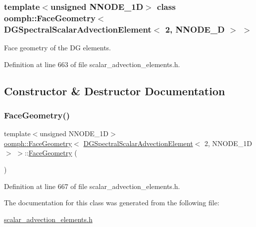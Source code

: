 \subsubsection*{template$<$unsigned N\+N\+O\+D\+E\+\_\+1D$>$\newline
class oomph\+::\+Face\+Geometry$<$ D\+G\+Spectral\+Scalar\+Advection\+Element$<$ 2, N\+N\+O\+D\+E\+\_\+D $>$ $>$}

Face geometry of the DG elements. 

Definition at line 663 of file scalar\+\_\+advection\+\_\+elements.\+h.



\subsection{Constructor \& Destructor Documentation}
\mbox{\label{classoomph_1_1FaceGeometry_3_01DGSpectralScalarAdvectionElement_3_012_00_01NNODE__1D_01_4_01_4_ac156f6fea2c6496086473d1a0c888124}} 
\subsubsection{\texorpdfstring{Face\+Geometry()}{FaceGeometry()}}
{\footnotesize\ttfamily template$<$unsigned N\+N\+O\+D\+E\+\_\+1D$>$ \\
\hyperlink{classoomph_1_1FaceGeometry}{oomph\+::\+Face\+Geometry}$<$ \hyperlink{classoomph_1_1DGSpectralScalarAdvectionElement}{D\+G\+Spectral\+Scalar\+Advection\+Element}$<$ 2, N\+N\+O\+D\+E\+\_\+1D $>$ $>$\+::\hyperlink{classoomph_1_1FaceGeometry}{Face\+Geometry} (\begin{DoxyParamCaption}{ }\end{DoxyParamCaption})\hspace{0.3cm}{\ttfamily [inline]}}



Definition at line 667 of file scalar\+\_\+advection\+\_\+elements.\+h.



The documentation for this class was generated from the following file\+:\begin{DoxyCompactItemize}
\item 
\hyperlink{scalar__advection__elements_8h}{scalar\+\_\+advection\+\_\+elements.\+h}\end{DoxyCompactItemize}
